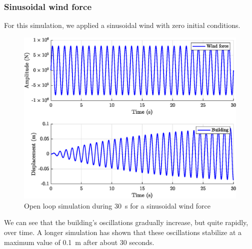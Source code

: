\subsubsection{Sinusoidal wind force}
For this simulation, we applied a sinusoidal wind with zero initial conditions.
\begin{figure}[H]
    \centering
    \includegraphics[width=\textwidth]{resources/eps/sinusoidal-wind.eps}
    \caption{Open loop simulation during \SI{30}{\second} for a sinusoidal wind force}
\end{figure}
We can see that the building's oscillations gradually increase, but quite rapidly, over time. A longer simulation has shown that these oscillations stabilize at a maximum value of \SI{0.1}{\meter} after about 30 seconds.

